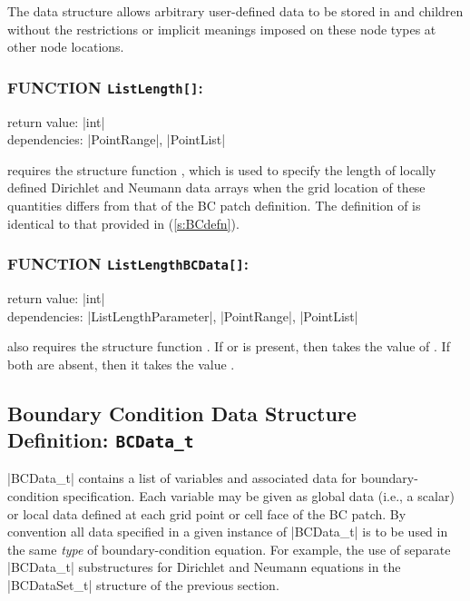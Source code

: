 The  data structure allows arbitrary
user-defined data to be stored in  and
 children without the restrictions or implicit
meanings imposed on these node types at other node locations.

\subsubsection*{FUNCTION \texttt{ListLength[]}:}

\noindent return value: |int| \\
\noindent dependencies: |PointRange|, |PointList|

 requires the structure function , which is
used to specify the length of locally defined Dirichlet and Neumann data arrays
when the grid location of these quantities differs from that of the BC patch
definition. The definition of  is identical to that provided in
 (\autoref{s:BCdefn}).

\subsubsection*{FUNCTION \texttt{ListLengthBCData[]}:}

\noindent return value: |int| \\
\noindent dependencies: |ListLengthParameter|, |PointRange|, |PointList|

 also requires the structure function
. If  or  is present,
then  takes the value of .  If both are
absent, then it takes the value .

\subsection{Boundary Condition Data Structure Definition: \texttt{BCData\_t}}
\label{s:BCData}

|BCData_t| contains a list of variables and associated data for
boundary-condition specification.
Each variable may be given as global data (i.e., a scalar) or local data
defined at each grid point or cell face of the BC patch.
By convention all data specified in a given instance of |BCData_t| is to
be used in the same \emph{type} of boundary-condition equation.
For example, the use of separate |BCData_t| substructures for Dirichlet
and Neumann equations in the |BCDataSet_t| structure of the previous
section.


